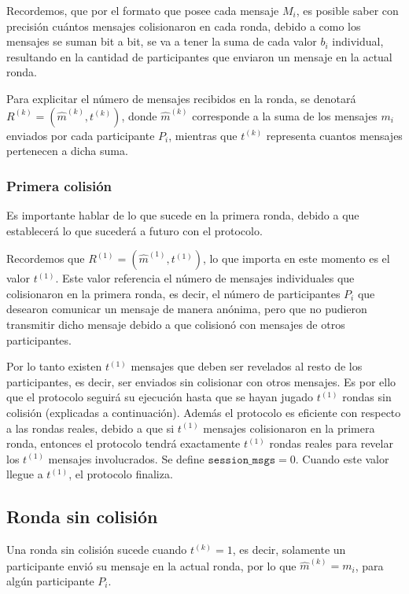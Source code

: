 Recordemos, que por el formato que posee cada mensaje $M_i$, es posible saber con 
precisión cuántos mensajes colisionaron en cada ronda, debido a como los mensajes 
se suman bit a bit, se va a tener la suma de cada valor $b_i$ individual, resultando 
en la cantidad de participantes que enviaron un mensaje en la actual ronda.

Para explicitar el número de mensajes recibidos en la ronda, se denotará 
$R^{(k)} = (\hat{m}^{(k)}, t^{(k)})$, donde $\hat{m}^{(k)}$ corresponde a la suma de 
los mensajes $m_i$ enviados por cada participante $P_i$, mientras que $t^{(k)}$ 
representa cuantos mensajes pertenecen a dicha suma.

\subsubsection{Primera colisión}

Es importante hablar de lo que sucede en la primera ronda, debido a que establecerá lo 
que sucederá a futuro con el protocolo.

Recordemos que $R^{(1)} = (\hat{m}^{(1)}, t^{(1)})$, lo que importa en este momento es 
el valor $t^{(1)}$. Este valor referencia el número de mensajes individuales que 
colisionaron en la primera ronda, es decir, el número de participantes $P_i$ que desearon 
comunicar un mensaje de manera anónima, pero que no pudieron transmitir dicho mensaje 
debido a que colisionó con mensajes de otros participantes.

Por lo tanto existen $t^{(1)}$ mensajes que deben ser revelados al resto de los 
participantes, es decir, ser enviados sin colisionar con otros mensajes. Es por ello que 
el protocolo seguirá su ejecución hasta que se hayan jugado $t^{(1)}$ rondas sin colisión 
(explicadas a continuación). Además el protocolo es eficiente con respecto a las rondas 
reales, debido a que si $t^{(1)}$ mensajes colisionaron en la primera ronda, entonces el 
protocolo tendrá exactamente $t^{(1)}$ rondas reales para revelar los $t^{(1)}$ mensajes 
involucrados. Se define $\mathtt{session\_msgs} = 0$. Cuando este valor llegue a $t^{(1)}$, 
el protocolo finaliza.

\subsection{Ronda sin colisión}

Una ronda sin colisión sucede cuando $t^{(k)} = 1$, es decir, solamente un participante 
envió su mensaje en la actual ronda, por lo que $\hat{m}^{(k)} = m_i$, para algún 
participante $P_i$.

